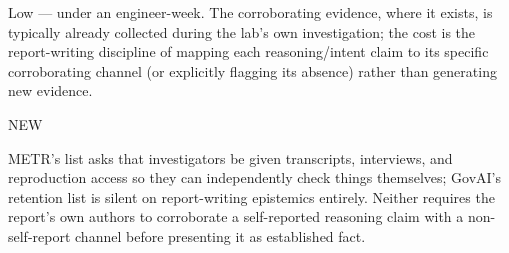 \begin{description}[leftmargin=2.2cm, style=nextline]
\item[Cost band] Low --- under an engineer-week. The corroborating evidence, where it exists, is typically already collected during the lab's own investigation; the cost is the report-writing discipline of mapping each reasoning/intent claim to its specific corroborating channel (or explicitly flagging its absence) rather than generating new evidence.
\item[vs. prior art] NEW
\item[Prior-art note] METR's list asks that investigators be given transcripts, interviews, and reproduction access so they can independently check things themselves; GovAI's retention list is silent on report-writing epistemics entirely. Neither requires the report's own authors to corroborate a self-reported reasoning claim with a non-self-report channel before presenting it as established fact.
\end{description}

